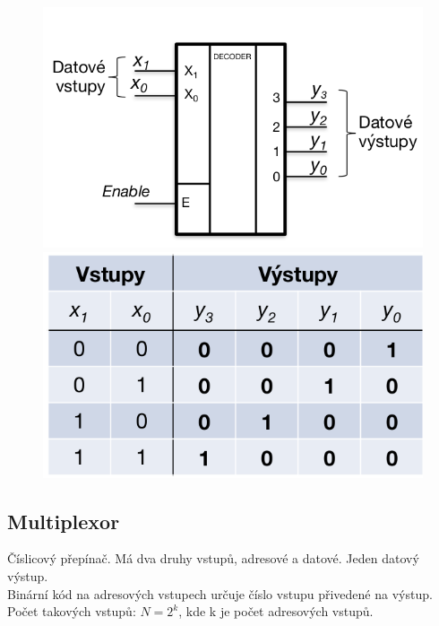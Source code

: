 \begin{figure}[h!]
    \centering
    \begin{minipage}[b]{0.4\textwidth}
        \includegraphics[width=\textwidth]{img/BinDekod.png}
    \end{minipage}
    \hfill
    \begin{minipage}[b]{0.4\textwidth}
        \includegraphics[width=\textwidth]{img/BinDekTab.png}
    \end{minipage}
\end{figure}

\subsection{Multiplexor}
Číslicový přepínač. Má dva druhy vstupů, adresové a datové. Jeden datový výstup.\\
Binární kód na adresových vstupech určuje číslo vstupu přivedené na výstup.\\
Počet takových vstupů: \(N = 2^k\), kde k je počet adresových vstupů.\\


